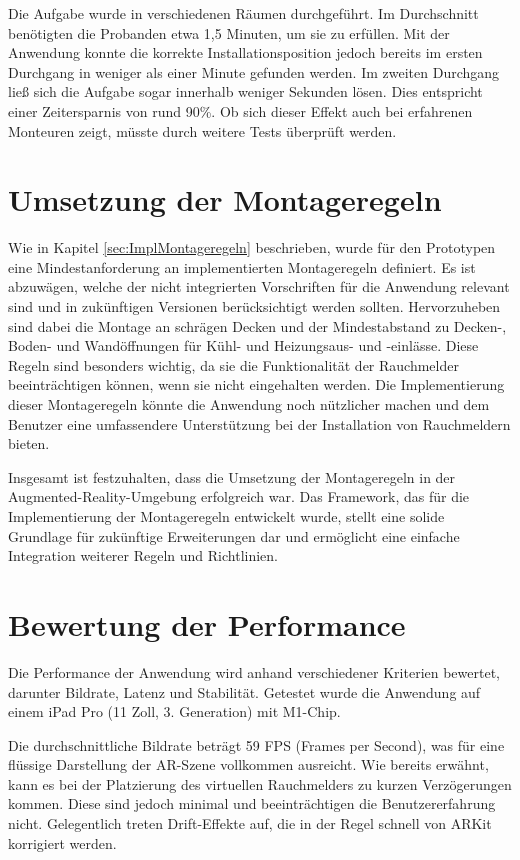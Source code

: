 Die Aufgabe wurde in verschiedenen Räumen durchgeführt. Im Durchschnitt benötigten die Probanden etwa 1,5 Minuten, um sie zu erfüllen. Mit der Anwendung konnte die korrekte Installationsposition jedoch bereits im ersten Durchgang in weniger als einer Minute gefunden werden. Im zweiten Durchgang ließ sich die Aufgabe sogar innerhalb weniger Sekunden lösen. Dies entspricht einer Zeitersparnis von rund 90\%. Ob sich dieser Effekt auch bei erfahrenen Monteuren zeigt, müsste durch weitere Tests überprüft werden.

\section{Umsetzung der Montageregeln}

Wie in Kapitel \ref{sec:ImplMontageregeln} beschrieben, wurde für den Prototypen eine Mindestanforderung an implementierten Montageregeln definiert. Es ist abzuwägen, welche der nicht integrierten Vorschriften für die Anwendung relevant sind und in zukünftigen Versionen berücksichtigt werden sollten. Hervorzuheben sind dabei die Montage an schrägen Decken und der Mindestabstand zu Decken-, Boden- und Wandöffnungen für Kühl- und Heizungsaus- und -einlässe. Diese Regeln sind besonders wichtig, da sie die Funktionalität der Rauchmelder beeinträchtigen können, wenn sie nicht eingehalten werden. Die Implementierung dieser Montageregeln könnte die Anwendung noch nützlicher machen und dem Benutzer eine umfassendere Unterstützung bei der Installation von Rauchmeldern bieten.

Insgesamt ist festzuhalten, dass die Umsetzung der Montageregeln in der Augmented-Reality-Umgebung erfolgreich war. Das Framework, das für die Implementierung der Montageregeln entwickelt wurde, stellt eine solide Grundlage für zukünftige Erweiterungen dar und ermöglicht eine einfache Integration weiterer Regeln und Richtlinien.

\section{Bewertung der Performance}

Die Performance der Anwendung wird anhand verschiedener Kriterien bewertet, darunter Bildrate, Latenz und Stabilität. Getestet wurde die Anwendung auf einem iPad Pro (11 Zoll, 3. Generation) mit M1-Chip.

Die durchschnittliche Bildrate beträgt 59 FPS (Frames per Second), was für eine flüssige Darstellung der AR-Szene vollkommen ausreicht. Wie bereits erwähnt, kann es bei der Platzierung des virtuellen Rauchmelders zu kurzen Verzögerungen kommen. Diese sind jedoch minimal und beeinträchtigen die Benutzererfahrung nicht. Gelegentlich treten Drift-Effekte auf, die in der Regel schnell von ARKit korrigiert werden.

